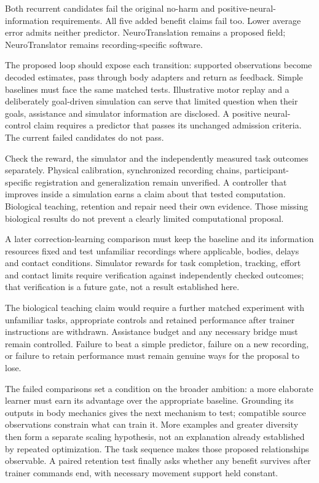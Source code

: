 Both recurrent candidates fail the original no-harm and positive-neural-information requirements. All five added benefit claims fail too. Lower average error admits neither predictor. NeuroTranslation remains a proposed field; NeuroTranslator remains recording-specific software.

The proposed loop should expose each transition: supported observations become decoded estimates, pass through body adapters and return as feedback. Simple baselines must face the same matched tests. Illustrative motor replay and a deliberately goal-driven simulation can serve that limited question when their goals, assistance and simulator information are disclosed. A positive neural-control claim requires a predictor that passes its unchanged admission criteria. The current failed candidates do not pass.

Check the reward, the simulator and the independently measured task outcomes separately. Physical calibration, synchronized recording chains, participant-specific registration and generalization remain unverified. A controller that improves inside a simulation earns a claim about that tested computation. Biological teaching, retention and repair need their own evidence. Those missing biological results do not prevent a clearly limited computational proposal.

A later correction-learning comparison must keep the baseline and its information
resources fixed and test unfamiliar recordings where applicable, bodies, delays
and contact conditions. Simulator rewards for task completion, tracking, effort
and contact limits require verification against independently checked outcomes;
that verification is a future gate, not a result established here.

The biological teaching claim would require a further matched experiment with
unfamiliar tasks, appropriate controls and retained performance after trainer
instructions are withdrawn. Assistance budget and any necessary bridge must
remain controlled. Failure to beat a simple predictor, failure on a new
recording, or failure to retain performance must remain genuine ways for the
proposal to lose.

The failed comparisons set a condition on the broader ambition: a more elaborate learner must earn its advantage over the appropriate baseline. Grounding its outputs in body mechanics gives the next mechanism to test; compatible source observations constrain what can train it. More examples and greater diversity then form a separate scaling hypothesis, not an explanation already established by repeated optimization. The task sequence makes those proposed relationships observable. A paired retention test finally asks whether any benefit survives after trainer commands end, with necessary movement support held constant.

